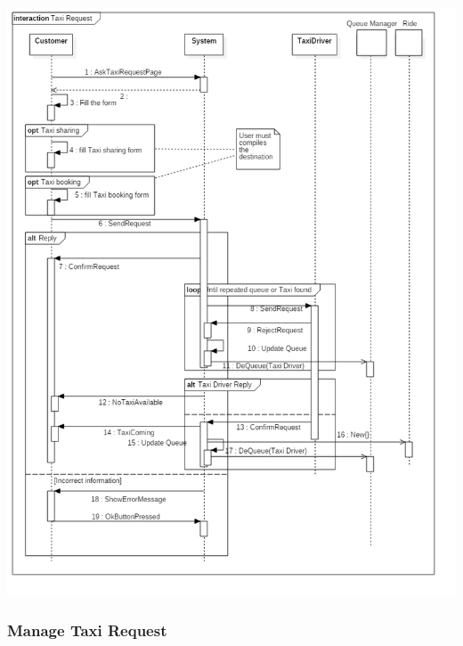 \documentclass[english]{article}
\begin{document}
\includegraphics[width=\textwidth]{TaxiRequest}

\subsubsection{Manage Taxi Request}
\end{document}
